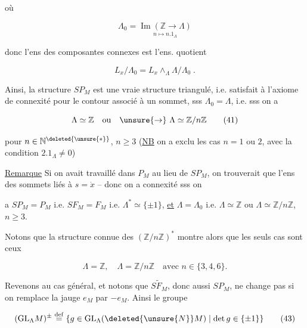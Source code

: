 
où

\[
\Lambda_0=\underset{\scriptstyle n\longmapsto n.1_\Lambda}{\operatorname{Im}(\mathbb{Z}\longrightarrow\Lambda)}
\tag*{(39)}
\]

donc l'ens des composantes connexes est l'ens.  quotient

\[
L_x/\Lambda_0=L_x\mathbin{\wedge}_{\Lambda}\Lambda/\Lambda_0\;.\tag*{(40)}
\]

Ainsi, la structure $SP_M$ est une vraie structure  triangulé,  i.e. satisfait à l'axiome de connexité pour le contour associé à un sommet, sss $\Lambda_0=\Lambda$, i.e. sss on a

\[
\Lambda\simeq\mathbb{Z}\quad\text{ou}\quad\unsure{\rightarrow}\ \Lambda\simeq\mathbb{Z}/n\mathbb{Z}\tag*{(41)}
\]

pour $n\in\mathbb{N}^{\deleted{\unsure{*}}}$, $n\geq 3$ (\uline{NB} on a exclu les cas $n=1$ ou $2$, avec la condition $2.1_\Lambda\ne 0$)

\uline{Remarque} Si on avait travaillé dans $P_M$ au lieu de $SP_M$, on trouverait que  l'ens des sommets liés à $s=\dot{x}$      -- donc on a connexité sss on



a $SP_M=P_M$ i.e. $SF_M=F_M$ i.e. $\Lambda^*\simeq\{\pm1\}$, \uline{et} $\Lambda=\Lambda_0$ i.e. $\Lambda\simeq\mathbb{Z}$ ou $\Lambda\simeq\mathbb{Z}/n\mathbb{Z}$, $n\geq3$.

Notons que la structure connue des $(\mathbb{Z}/n\mathbb{Z})^*$ montre alors que les seuls cas sont ceux  

\[
\Lambda=\mathbb{Z},\quad\Lambda=\mathbb{Z}/n\mathbb{Z}\quad\text{avec }n\in\{3,4,6\}.\tag*{(42)}
\]

Revenons au cas général,  et notons que $S\widetilde{F}_M$, donc aussi $SP_M$, ne  change pas si on remplace la jauge $e_M$ par $-e_M$. Ainsi le groupe

\[
(\mathrm{GL}_{\Lambda}M)^{\pm}\overset{\mathrm{def}}{=}\{g\in\mathrm{GL}_{\Lambda}(\deleted{\unsure{N}}M)\mid\det g\in\{\pm1\}\}\tag*{(43)}
\]

